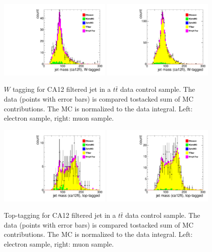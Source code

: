 \begin{figure}[!htb]
\centering
\includegraphics[width=0.49\textwidth]{figs/Wen/taggedW_ca12ft.pdf}
\includegraphics[width=0.49\textwidth]{figs/Wmn/taggedW_ca12ft.pdf}
\caption{$W$ tagging for CA12 filtered jet in a $t\bar{t}$ data control sample. The data (points with error bars) is compared tostacked sum of MC contributions. The MC is normalized to the data integral. Left: electron sample, right: muon sample.}
\label{figs:Wtagging12}
\end{figure}

\begin{figure}[!htb]
\centering
\includegraphics[width=0.49\textwidth]{figs/Wen/taggedTop_ca12ft.pdf}
\includegraphics[width=0.49\textwidth]{figs/Wmn/taggedTop_ca12ft.pdf}
\caption{Top-tagging for CA12 filtered jet in a $t\bar{t}$ data control sample. The data (points with error bars) is compared tostacked sum of MC contributions. The MC is normalized to the data integral. Left: electron sample, right: muon sample.}
\label{figs:toptagging12}
\end{figure}
 
